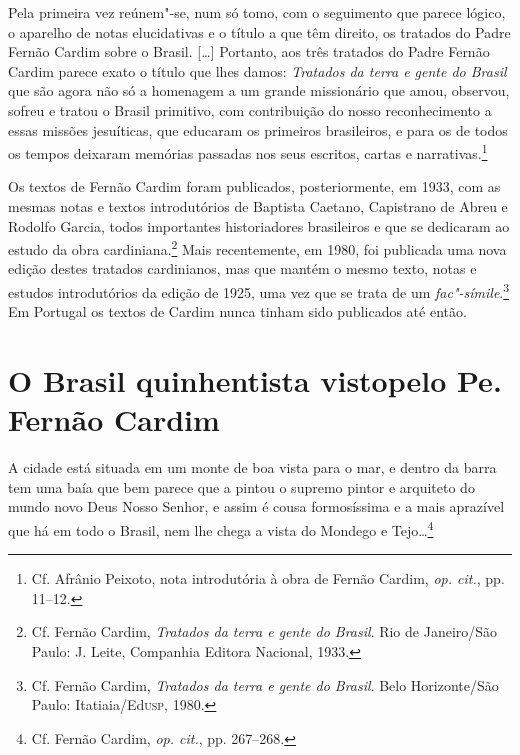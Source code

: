 \begin{hedraquote}
Pela primeira vez reúnem"-se, num só tomo, com o seguimento
que parece lógico, o aparelho de notas elucidativas e o título a que
têm direito, os tratados do Padre Fernão Cardim sobre o Brasil. [\ldots{}]
Portanto, aos três tratados do Padre Fernão Cardim parece exato o
título que lhes damos: \textit{Tratados da terra e gente do Brasil} 
que são agora não só a homenagem a um grande missionário que
amou, observou, sofreu e tratou o Brasil primitivo, com contribuição do
nosso reconhecimento a essas missões jesuíticas, que educaram os
primeiros brasileiros, e para os de todos os tempos deixaram memórias
passadas nos seus escritos, cartas e narrativas.\footnote{ Cf. Afrânio Peixoto, 
nota introdutória à obra de Fernão Cardim, \textit{op. cit.}, pp. 11--12.} 
\end{hedraquote}

 Os textos de Fernão Cardim foram publicados, posteriormente,
em 1933, com as mesmas notas e textos introdutórios de Baptista
Caetano, Capistrano de Abreu e Rodolfo Garcia, todos importantes
historiadores brasileiros e que se dedicaram ao estudo da obra
cardiniana.\footnote{ Cf. Fernão Cardim, \textit{Tratados da terra
e gente do Brasil}. Rio de Janeiro/São Paulo: J. Leite, Companhia
Editora Nacional, 1933.} Mais recentemente, em 1980, foi publicada uma nova
edição destes tratados cardinianos, mas que mantém o mesmo
texto, notas e estudos introdutórios da edição de 1925, uma vez que se
trata de um \textit{fac"-símile}.\footnote{ Cf. Fernão Cardim, \textit{Tratados
da terra e gente do Brasil}. Belo Horizonte/São Paulo: Itatiaia/Ed\textsc{usp}, 1980.} 
Em Portugal os textos de Cardim nunca tinham sido publicados até então.

\section{O Brasil quinhentista visto\break pelo Pe. Fernão Cardim}

\begin{hedraquote}
A cidade está situada em um monte de boa vista para o mar,
e dentro da barra tem uma baía que bem parece que a pintou o supremo
pintor e arquiteto do mundo novo Deus Nosso Senhor, e assim é cousa
formosíssima e a mais aprazível que há em todo o Brasil, nem lhe chega
a vista do Mondego e Tejo\ldots{}\footnote{ Cf. Fernão Cardim,
\textit{op. cit.}, pp. 267--268.}
\end{hedraquote}
 
